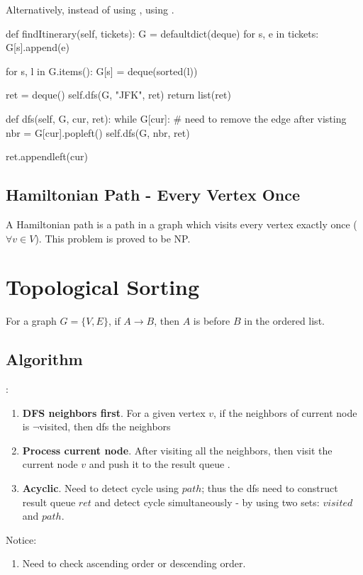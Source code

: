 Alternatively, instead of using , using .
\begin{python}
def findItinerary(self, tickets):
    G = defaultdict(deque)
    for s, e in tickets:
        G[s].append(e)
    
    for s, l in G.items():
        G[s] = deque(sorted(l))
    
    ret = deque()
    self.dfs(G, "JFK", ret)
    return list(ret)

def dfs(self, G, cur, ret):
    while G[cur]:
        # need to remove the edge after visting
        nbr = G[cur].popleft()
        self.dfs(G, nbr, ret)
    
    ret.appendleft(cur)
\end{python}

\subsection{Hamiltonian Path - Every Vertex Once} 

A Hamiltonian path is a path in a graph which visits every vertex exactly once ($\forall v \in V$). This problem is proved to be NP.

\section{Topological Sorting}
For a graph $G=\{V, E\}$, if $A \rightarrow B $, then $A$ is before $B$ in the ordered list.
\subsection{Algorithm}
:
\begin{enumerate}
\item \textbf{DFS neighbors first}. For a given vertex $v$, if the neighbors of current node is  $\neg$visited, then dfs the neighbors
\item \textbf{Process current node}. After visiting all the neighbors, then visit the current node $v$ and push it to the result queue .
\item \textbf{Acyclic}. Need to detect cycle using $path$; thus the dfs need to construct result queue $ret$ and detect cycle simultaneously - by using two sets: $visited$ and $path$.
\end{enumerate}
Notice:
\begin{enumerate}
\item Need to check ascending order or descending order.
\end{enumerate}

